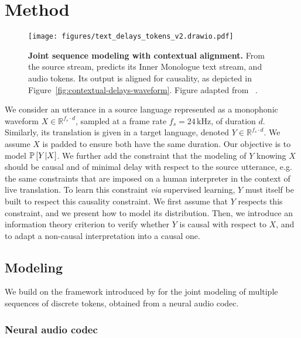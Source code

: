 \section{Method}
\label{method}

\begin{figure}[t]
    \centering
    \texttt{[image: figures/text\_delays\_tokens\_v2.drawio.pdf]}
    \caption{\textbf{Joint sequence modeling with contextual alignment.} From the source stream, \ours predicts its Inner Monologue text
    stream, and audio tokens.
    Its output is aligned for causality, as depicted in Figure~\ref{fig:contextual-delays-waveform}. Figure adapted from ~\citet{moshi}.
    }
    \label{fig:joint-modeling}
\end{figure}
We consider an utterance in a source language represented as
a monophonic waveform $X \in\mathbb{R}^{f_s \cdot d}$, sampled at a frame rate $f_s = 24\,\mathrm{kHz}$, of duration $d$.
Similarly, its translation is given in a target language,
denoted $Y \in \mathbb{R}^{f_s \cdot d}$. We assume $X$ is padded to ensure both have the same duration. Our objective is to model $\mathbb{P}\left[Y | X\right]$.
We further add the constraint that the modeling of $Y$ knowing $X$ 
should be causal and of minimal delay with respect
to the source utterance, e.g. the same constraints that are imposed on a human interpreter in the context of live translation. 
To learn this constraint \textit{via} supervised learning, $Y$ must itself be built to respect this causality constraint.
We first assume that $Y$ respects this constraint, and we present how to model
its distribution. Then, we introduce an information theory criterion 
to verify whether $Y$ is causal with respect to $X$, and to adapt
a non-causal interpretation into a causal one.

\subsection{Modeling}

We build on the framework introduced by \citet{moshi} for the joint modeling of
multiple sequences of discrete tokens, obtained from a neural audio codec.


\subsubsection{Neural audio codec}

